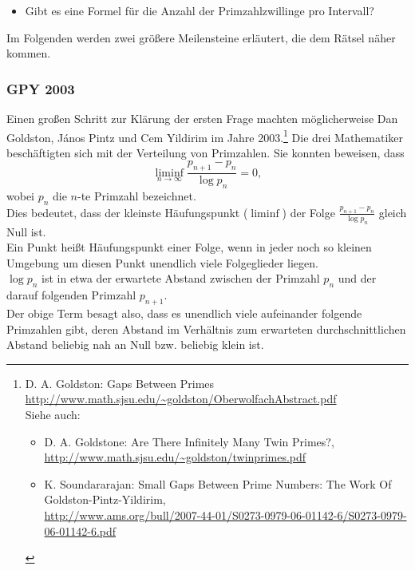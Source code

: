 \begin{refsegment}
\begin{itemize}
\item Gibt es eine Formel für die Anzahl der Primzahlzwillinge pro Intervall?
\end{itemize}

 Im Folgenden werden zwei größere Meilensteine erläutert, die dem
Rätsel näher kommen.


\subsubsection{GPY 2003}

Einen großen Schritt zur Klärung der ersten Frage machten möglicherweise
Dan Goldston, J\'{a}nos Pintz und Cem Yildirim im Jahre 2003.\footnote{%
    D. A. Goldston: \glqq Gaps Between Primes\grqq \\
    \url{http://www.math.sjsu.edu/~goldston/OberwolfachAbstract.pdf}\\
    Siehe auch:
    \begin{itemize}[nosep,label=-]
       \item D. A. Goldstone: \glqq Are There Infinitely Many Twin Primes?\grqq, \\
          \url{http://www.math.sjsu.edu/~goldston/twinprimes.pdf}
       \item K. Soundararajan: \glqq Small Gaps Between Prime Numbers:
           The Work Of Goldston-Pintz-Yildirim\grqq, \\
           \url{http://www.ams.org/bull/2007-44-01/S0273-0979-06-01142-6/S0273-0979-06-01142-6.pdf}
    \end{itemize}
    \vspace{-\baselineskip} %
   }
Die drei Mathematiker beschäftigten sich mit der Verteilung von Primzahlen.
Sie konnten beweisen, dass  \[ \liminf_{n\to\infty}{\frac{p_{n+1}-p_n}{\log{p_n}}}=0,\]
wobei $p_{n}$ die $n$-te Primzahl bezeichnet. \\
Dies bedeutet, dass der kleinste Häufungspunkt ($\liminf$) der Folge
$\frac{p_{n+1}-p_n}{\log{p_n}}$ gleich Null ist.\\
Ein Punkt heißt Häufungspunkt einer Folge, wenn in jeder noch so kleinen
Umgebung um diesen Punkt unendlich viele Folgeglieder liegen. \\
$\log{p_n}$ ist in etwa der erwartete Abstand zwischen der Primzahl $p_n$
und der darauf folgenden Primzahl $p_{n+1}$.\\
Der obige Term besagt also, dass es unendlich viele aufeinander folgende
Primzahlen gibt, deren Abstand im Verhältnis zum erwarteten durchschnittlichen
Abstand beliebig nah an Null bzw. beliebig klein ist.


\end{refsegment}
